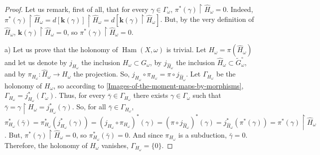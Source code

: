 \documentclass[10pt,reqno,twoside]{amsart}
\DeclareMathOperator{\Ham}{Ham}
\newcommand{\tidGomega}{\widetilde{G}_\omega^\circ}
\newcommand{\ek}{\mathbf{k}}
\theoremstyle{plain}
\theoremstyle{definition}
\begin{document}
  \begin{proof}
    Let us remark,
    first of all,
    that for every $\gamma \in \Gamma_\omega$,
    $\pi^*(\gamma) \restriction \widehat H_\omega = 0$.
    Indeed,
    $\pi^*(\gamma) \restriction \widehat H_\omega = d[\ek(\gamma)] \restriction \widehat H_\omega = d[\ek(\gamma)\restriction \widehat H_\omega]$.
    But,
    by the very definition of $\widehat H_\omega$,
    $\ek(\gamma)\restriction \widehat H_\omega = 0$,
    so $\pi^*(\gamma) \restriction \widehat H_\omega = 0$.
    
    a) Let us prove that the holonomy of $\Ham(X,\omega)$ is trivial.
    Let $H_\omega = \pi(\widehat H_\omega)$ and let us denote by $j_{H_\omega}$ the inclusion $H_\omega \subset G_\omega$,
    by $j_{\widehat H_\omega}$ the inclusion $\widehat H_\omega \subset \tidGomega$,
    and by $\pi_{H_\omega} : \widehat H_\omega \to H_\omega$ the projection.
    So,
    $ j_{H_\omega} \circ \pi_{H_\omega} = \pi \circ j_{\widehat H_\omega}$.
    Let $\Gamma_{H_\omega}$ be the holonomy of $H_\omega$,
    so according to \ref{Images-of-the-moment-maps-by-morphisms},
    $\Gamma_{H_\omega} = j_{H_\omega}^*(\Gamma_\omega)$.
    Thus,
    for every $\bar \gamma \in \Gamma_{H_\omega}$ there exists $\gamma \in \Gamma_\omega$ such that $\bar \gamma = \gamma \restriction H_\omega = j_{H_\omega}^*(\gamma)$.
    So,
    for all $\bar \gamma \in \Gamma_{H_\omega}$,
    $\pi_{H_\omega}^* (\bar \gamma) = \pi_{H_\omega}^* (j_{H_\omega}^*(\gamma)) = (j_{H_\omega} \circ \pi_{H_\omega})^*(\gamma) = (\pi \circ j_{\widehat H_\omega})^*(\gamma) = j_{\widehat H_\omega}^*(\pi^*(\gamma)) = \pi^*(\gamma) \restriction \widehat H_\omega$.
    But,
    $\pi^*(\gamma) \restriction \widehat H_\omega = 0$,
    so $\pi_{H_\omega}^*(\bar \gamma) = 0$.
    And since $\pi_{H_\omega}$ is a subduction,
    $\bar \gamma = 0$.
    Therefore,
    the holonomy of $H_\omega$ vanishes,
    $\Gamma_{H_\omega} = \{0\}$.
    

\end{proof}
\end{document}
